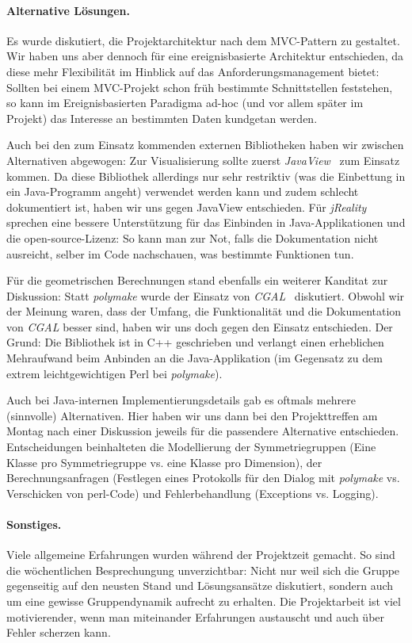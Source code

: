 \paragraph{Alternative Lösungen.}
Es wurde diskutiert, die Projektarchitektur nach dem MVC-Pattern zu gestaltet. Wir haben uns aber dennoch für eine ereignisbasierte Architektur
entschieden, da diese mehr Flexibilität im Hinblick auf das Anforderungsmanagement bietet: Sollten bei einem MVC-Projekt schon früh bestimmte
Schnittstellen feststehen, so kann im Ereignisbasierten Paradigma ad-hoc (und vor allem später im Projekt) das Interesse an bestimmten Daten kundgetan werden.

\noindent Auch bei den zum Einsatz kommenden externen Bibliotheken haben wir zwischen Alternativen abgewogen: Zur Visualisierung
sollte zuerst \emph{JavaView}~\cite{javaview} zum Einsatz kommen. Da diese Bibliothek allerdings nur sehr restriktiv (was die Einbettung in ein Java-Programm angeht) verwendet werden kann und zudem schlecht dokumentiert ist, haben wir uns gegen JavaView entschieden.
Für \emph{jReality} sprechen eine bessere Unterstützung für das Einbinden in Java-Applikationen und die open-source-Lizenz: So kann man zur Not,
falls die Dokumentation nicht ausreicht, selber im Code nachschauen, was bestimmte Funktionen tun.

\noindent Für die geometrischen Berechnungen stand ebenfalls ein weiterer Kanditat zur Diskussion: Statt \emph{polymake} wurde der
Einsatz von \emph{CGAL}~\cite{cgal} diskutiert. Obwohl wir der Meinung waren, dass der Umfang, die Funktionalität und die Dokumentation von \emph{CGAL} besser sind, haben wir uns doch gegen den Einsatz entschieden. Der Grund: Die Bibliothek ist in C++ geschrieben und 
verlangt einen erheblichen Mehraufwand beim Anbinden an die Java-Applikation (im Gegensatz zu dem extrem leichtgewichtigen Perl bei \emph{polymake}).

\noindent Auch bei Java-internen Implementierungsdetails gab es oftmals mehrere (sinnvolle) Alternativen. Hier haben wir uns dann bei den Projekttreffen am Montag nach einer Diskussion jeweils für die passendere Alternative entschieden. Entscheidungen beinhalteten
die Modellierung der Symmetriegruppen (Eine Klasse pro Symmetriegruppe vs. eine Klasse pro Dimension), der Berechnungsanfragen
(Festlegen eines Protokolls für den Dialog mit \emph{polymake} vs. Verschicken von perl-Code) und
Fehlerbehandlung (Exceptions vs. Logging).
\paragraph{Sonstiges.}
Viele allgemeine Erfahrungen wurden während der Projektzeit gemacht. So sind die wöchentlichen Besprechungung unverzichtbar:
Nicht nur weil sich die Gruppe gegenseitig auf den neusten Stand und Lösungsansätze diskutiert, sondern auch um eine gewisse
Gruppendynamik aufrecht zu erhalten. Die Projektarbeit ist viel motivierender, wenn man miteinander Erfahrungen austauscht
und auch über Fehler scherzen kann.

